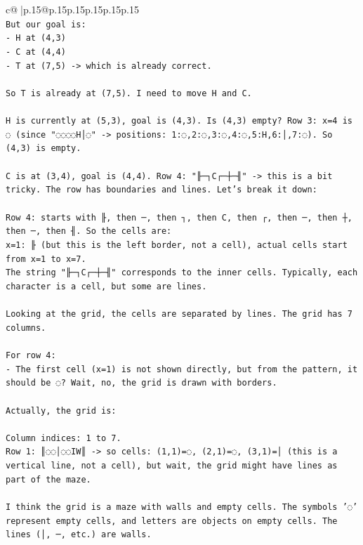 \documentclass{article}
\begin{document}
{\begin{supertabular}{c@{$\;$}|p{.15\linewidth}@{}p{.15\linewidth}p{.15\linewidth}p{.15\linewidth}p{.15\linewidth}p{.15\linewidth}}
{{{\\ 
\texttt{But our goal is:} \\
\texttt{{-} H at (4,3)} \\
\texttt{{-} C at (4,4)} \\
\texttt{{-} T at (7,5) {-}> which is already correct.} \\
\\ 
\texttt{So T is already at (7,5). I need to move H and C.} \\
\\ 
\texttt{H is currently at (5,3), goal is (4,3). Is (4,3) empty? Row 3: x=4 is ◌ (since "◌◌◌◌H│◌" {-}> positions: 1:◌,2:◌,3:◌,4:◌,5:H,6:│,7:◌). So (4,3) is empty.} \\
\\ 
\texttt{C is at (3,4), goal is (4,4). Row 4: "╟─┐C┌─┼─╢" {-}> this is a bit tricky. The row has boundaries and lines. Let's break it down:} \\
\\ 
\texttt{Row 4: starts with ╟, then ─, then ┐, then C, then ┌, then ─, then ┼, then ─, then ╢. So the cells are:} \\
\texttt{x=1: ╟ (but this is the left border, not a cell), actual cells start from x=1 to x=7.} \\
\texttt{The string "╟─┐C┌─┼─╢" corresponds to the inner cells. Typically, each character is a cell, but some are lines.} \\
\\ 
\texttt{Looking at the grid, the cells are separated by lines. The grid has 7 columns.} \\
\\ 
\texttt{For row 4:} \\
\texttt{{-} The first cell (x=1) is not shown directly, but from the pattern, it should be ◌? Wait, no, the grid is drawn with borders.} \\
\\ 
\texttt{Actually, the grid is:} \\
\\ 
\texttt{Column indices: 1 to 7.} \\
\texttt{Row 1: ║◌◌│◌◌IW║ {-}> so cells: (1,1)=◌, (2,1)=◌, (3,1)=│ (this is a vertical line, not a cell), but wait, the grid might have lines as part of the maze.} \\
\\ 
\texttt{I think the grid is a maze with walls and empty cells. The symbols '◌' represent empty cells, and letters are objects on empty cells. The lines (│, ─, etc.) are walls.} \\
}}}
\end{supertabular}}
\end{document}
